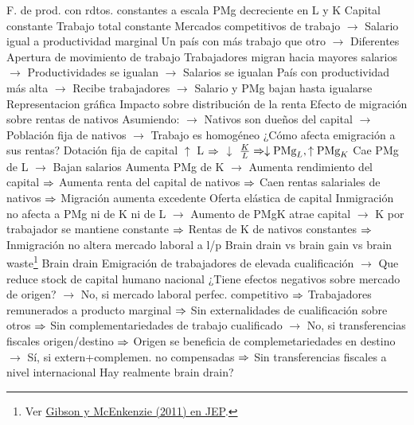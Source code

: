 \documentclass{nuevotema}
\begin{document}
\begin{esquemal}
				\4[] F. de prod. con rdtos. constantes a escala
				\4[] PMg decreciente en L y K
				\4[] Capital constante
				\4[] Trabajo total constante
				\4[] Mercados competitivos de trabajo
				\4[] $\to$ Salario igual a productividad marginal
				\4[] Un país con más trabajo que otro
				\4[] $\to$ Diferentes
				\4 Apertura de movimiento de trabajo
				\4[] Trabajadores migran hacia mayores salarios
				\4[] $\to$ Productividades se igualan
				\4[] $\to$ Salarios se igualan
				\4[] País con productividad más alta
				\4[] $\to$ Recibe trabajadores
				\4[] $\to$ Salario y PMg bajan hasta igualarse
				\4 Representacion gráfica
				\4[] 
			\3 Impacto sobre distribución de la renta
				\4 Efecto de migración sobre rentas de nativos
				\4[] Asumiendo:
				\4[] $\to$ Nativos son dueños del capital
				\4[] $\to$ Población fija de nativos
				\4[] $\to$ Trabajo es homogéneo
				\4[] ¿Cómo afecta emigración a sus rentas?
				\4 Dotación fija de capital
				\4[] $\uparrow$ L $\Rightarrow$ $\downarrow$ $\frac{K}{L} \Rightarrow \downarrow \text{PMg}_L, \uparrow \text{PMg}_K$
				\4[] Cae PMg de L
				\4[] $\to$ Bajan salarios
				\4[] Aumenta PMg de K
				\4[] $\to$ Aumenta rendimiento del capital
				\4[] $\Rightarrow$ Aumenta renta del capital de nativos
				\4[] $\Rightarrow$ Caen rentas salariales de nativos
				\4[] $\Rightarrow$ Migración aumenta excedente
				\4[] 
				\4 Oferta elástica de capital
				\4[] Inmigración no afecta a PMg ni de K ni de L
				\4[] $\to$ Aumento de PMgK atrae capital
				\4[] $\to$ K por trabajador se mantiene constante
				\4[] $\Rightarrow$ Rentas de K de nativos constantes
				\4[] $\Rightarrow$ Inmigración no altera mercado laboral a l/p
			\3 Brain drain vs brain gain vs brain waste\footnote{Ver \href{https://pubs.aeaweb.org/doi/pdfplus/10.1257/jep.25.3.107}{Gibson y McEnkenzie (2011) en JEP}.}
				\4 Brain drain
				\4[] Emigración de trabajadores de elevada cualificación
				\4[] $\to$ Que reduce stock de capital humano nacional
				\4[] ¿Tiene efectos negativos sobre mercado de origen?
				\4[] $\to$ No, si mercado laboral perfec. competitivo
				\4[] $\Rightarrow$ Trabajadores remunerados a producto marginal
				\4[] $\Rightarrow$ Sin externalidades de cualificación sobre otros
				\4[] $\Rightarrow$ Sin complementariedades de trabajo cualificado
				\4[] $\to$ No, si transferencias fiscales origen/destino
				\4[] $\Rightarrow$ Origen se beneficia de complemetariedades en destino
				\4[] $\to$ Sí, si extern+complemen. no compensadas
				\4[] $\Rightarrow$ Sin transferencias fiscales a nivel internacional
				\4[] Hay realmente brain drain?

\end{esquemal}
\end{document}
